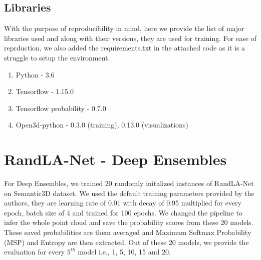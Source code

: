     \subsection*{Libraries}
    With the purpose of reproducibility in mind, here we provide the list of major libraries used and along with their versions, they are used for training.
    For ease of reprduction, we also added the requirements.txt in the attached code as it is a struggle to setup the environment.
    \begin{enumerate}
        \item Python - 3.6
        \item Tensorflow - 1.15.0
        \item Tensorflow probability - 0.7.0
        \item Open3d-python - 0.3.0 (training), 0.13.0 (visualizations)
    \end{enumerate}
    
    \section{RandLA-Net - Deep Ensembles}
    For Deep Ensembles, we trained 20 randomly initalized instances of RandLA-Net on Semantic3D dataset.
    We used the default training parameters provided by the authors, they are learning rate of 0.01 with decay of 0.95 multiplied for every epoch, batch size of 4 and trained for 100 epochs.
    We changed the pipeline to infer the whole point cloud and save the probability scores from these 20 models.
    These saved probabilities are them averaged and Maximum Softmax Probability (MSP) and Entropy are then extracted.
    Out of these 20 models, we provide the evaluation for every $5^{th}$ model i.e., 1, 5, 10, 15 and 20.

